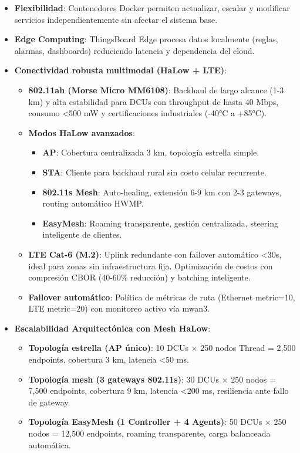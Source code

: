 \begin{itemize}
    \item \textbf{Flexibilidad}: Contenedores Docker permiten actualizar, escalar y modificar servicios independientemente sin afectar el sistema base.
    
    \item \textbf{Edge Computing}: ThingsBoard Edge procesa datos localmente (reglas, alarmas, dashboards) reduciendo latencia y dependencia del cloud.
    
    \item \textbf{Conectividad robusta multimodal (HaLow + LTE)}:
    \begin{itemize}
        \item \textbf{802.11ah (Morse Micro MM6108)}: Backhaul de largo alcance (1-3 km) y alta estabilidad para DCUs con throughput de hasta 40 Mbps, consumo <500 mW y certificaciones industriales (-40°C a +85°C).
        \item \textbf{Modos HaLow avanzados}:
        \begin{itemize}
            \item \textbf{AP}: Cobertura centralizada 3 km, topología estrella simple.
            \item \textbf{STA}: Cliente para backhaul rural sin costo celular recurrente.
            \item \textbf{802.11s Mesh}: Auto-healing, extensión 6-9 km con 2-3 gateways, routing automático HWMP.
            \item \textbf{EasyMesh}: Roaming transparente, gestión centralizada, steering inteligente de clientes.
        \end{itemize}
        \item \textbf{LTE Cat-6 (M.2)}: Uplink redundante con failover automático <30s, ideal para zonas sin infraestructura fija. Optimización de costos con compresión CBOR (40-60\% reducción) y batching inteligente.
        \item \textbf{Failover automático}: Política de métricas de ruta (Ethernet metric=10, LTE metric=20) con monitoreo activo vía mwan3.
    \end{itemize}
    
    \item \textbf{Escalabilidad Arquitectónica con Mesh HaLow}:
    \begin{itemize}
        \item \textbf{Topología estrella (AP único)}: 10 DCUs $\times$ 250 nodos Thread = 2,500 endpoints, cobertura 3 km, latencia <50 ms.
        \item \textbf{Topología mesh (3 gateways 802.11s)}: 30 DCUs $\times$ 250 nodos = 7,500 endpoints, cobertura 9 km, latencia <200 ms, resiliencia ante fallo de gateway.
        \item \textbf{Topología EasyMesh (1 Controller + 4 Agents)}: 50 DCUs $\times$ 250 nodos = 12,500 endpoints, roaming transparente, carga balanceada automática.
    \end{itemize}
    

\end{itemize}
